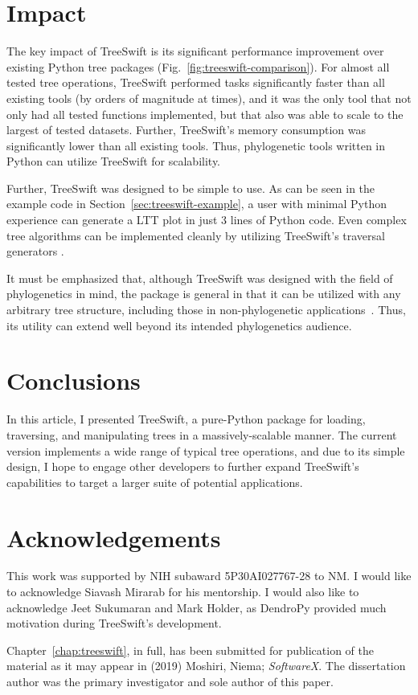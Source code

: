 \section{Impact}\label{sec:treeswift-impact}
The key impact of TreeSwift is its significant performance improvement over existing Python tree packages (Fig.~\ref{fig:treeswift-comparison}). For almost all tested tree operations, TreeSwift performed tasks significantly faster than all existing tools (by orders of magnitude at times), and it was the only tool that not only had all tested functions implemented, but that also was able to scale to the largest of tested datasets. Further, TreeSwift's memory consumption was significantly lower than all existing tools. Thus, phylogenetic tools written in Python can utilize TreeSwift for scalability.

Further, TreeSwift was designed to be simple to use. As can be seen in the example code in Section~\ref{sec:treeswift-example}, a user with minimal Python experience can generate a \gls{LTT} plot in just 3 lines of Python code. Even complex tree algorithms can be implemented cleanly by utilizing TreeSwift's traversal generators \cite{Balaban2019}.

It must be emphasized that, although TreeSwift was designed with the field of phylogenetics in mind, the package is general in that it can be utilized with any arbitrary tree structure, including those in non-phylogenetic applications~\cite{Moshiri2018b}. Thus, its utility can extend well beyond its intended phylogenetics audience.

\section{Conclusions}\label{sec:treeswift-conclusions}
In this article, I presented TreeSwift, a pure-Python package for loading, traversing, and manipulating trees in a massively-scalable manner. The current version implements a wide range of typical tree operations, and due to its simple design, I hope to engage other developers to further expand TreeSwift's capabilities to target a larger suite of potential applications.

\section{Acknowledgements}
This work was supported by NIH subaward 5P30AI027767-28 to NM. I would like to acknowledge Siavash Mirarab for his mentorship. I would also like to acknowledge Jeet Sukumaran and Mark Holder, as DendroPy provided much motivation during TreeSwift's development.

Chapter~\ref{chap:treeswift}, in full, has been submitted for publication of the material as it may appear in (2019) Moshiri, Niema; \textit{SoftwareX}. The dissertation author was the primary investigator and sole author of this paper. 

